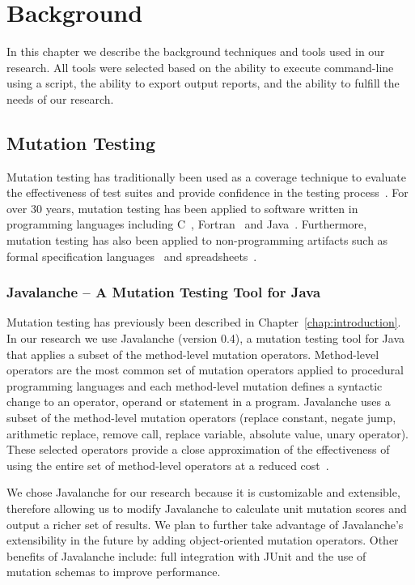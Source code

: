 \chapter{Background}
\label{chap:background}
In this chapter we describe the background techniques and tools used in our research. All tools were selected based on the ability to execute command-line using a script, the ability to export output reports, and the ability to fulfill the needs of our research.


\section{Mutation Testing}
\label{sec:background_mutation_testing}
Mutation testing has traditionally been used as a coverage technique to evaluate the effectiveness of test suites and provide confidence in the testing process~\cite{DLS78, JH10}. For over 30 years, mutation testing has been applied to software written in programming languages including C~\cite{DM96, JH08}, Fortran~\cite{KO91} and Java~\cite{MKO02, BCD06}. Furthermore, mutation testing has also been applied to non-programming artifacts such as formal specification languages~\cite{ABM98} and spreadsheets~\cite{AE09}.


\subsection{Javalanche -- A Mutation Testing Tool for Java}
\label{subsec:background_javalanche}
Mutation testing has previously been described in Chapter~\ref{chap:introduction}. In our research we use Javalanche (version 0.4), a mutation testing tool for Java~\cite{SZ09} that applies a subset of the method-level mutation operators. Method-level operators are the most common set of mutation operators applied to procedural programming languages and each method-level mutation defines a syntactic change to an operator, operand or statement in a program. Javalanche uses a subset of the method-level mutation operators (replace constant, negate jump, arithmetic replace, remove call, replace variable, absolute value, unary operator). These selected operators provide a close approximation of the effectiveness of using the entire set of method-level operators at a reduced cost~\cite{OLR+96}.

We chose Javalanche for our research because it is customizable and extensible, therefore allowing us to modify Javalanche to calculate unit mutation scores and output a richer set of results. We plan to further take advantage of Javalanche's extensibility in the future by adding object-oriented mutation operators. Other benefits of Javalanche include: full integration with JUnit and the use of mutation schemas to improve performance.


